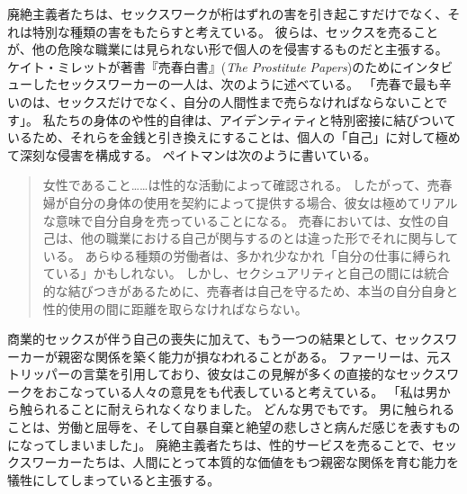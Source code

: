\documentclass[paper=a4,book,openany]{jlreq}
\begin{document}
廃絶主義者たちは、セックスワークが桁はずれの害を引き起こすだけでなく、それは特別な種類の害をもたらすと考えている。
彼らは、セックスを売ることが、他の危険な職業には見られない形で個人のを侵害するものだと主張する。
ケイト・ミレットが著書『売春白書』(\emph{The Prostitute Papers})のためにインタビューしたセックスワーカーの一人は、次のように述べている。
「売春で最も辛いのは、セックスだけでなく、自分の人間性まで売らなければならないことです」\citep[p.84]{millett76:_prost_paper}。
私たちの身体のや性的自律は、アイデンティティと特別密接に結びついているため、それらを金銭と引き換えにすることは、個人の「自己」に対して極めて深刻な侵害を構成する。
ペイトマンは次のように書いている。

\begin{quote}
女性であること……は性的な活動によって確認される。
したがって、売春婦が自分の身体の使用を契約によって提供する場合、彼女は極めてリアルな意味で自分自身を売っていることになる。
売春においては、女性の自己は、他の職業における自己が関与するのとは違った形でそれに関与している。
あらゆる種類の労働者は、多かれ少なかれ「自分の仕事に縛られている」かもしれない。
しかし、セクシュアリティと自己の間には統合的な結びつきがあるために、売春者は自己を守るため、本当の自分自身と性的使用の間に距離を取らなければならない。
\citep{pateman88:_sexual_contr}
\end{quote}

商業的セックスが伴う自己の喪失に加えて、もう一つの結果として、セックスワーカーが親密な関係を築く能力が損なわれることがある。
ファーリーは、元ストリッパーの言葉を引用しており、彼女はこの見解が多くの直接的なセックスワークをおこなっている人々の意見をも代表していると考えている。
「私は男から触られることに耐えられなくなりました。
どんな男でもです。
男に触られることは、労働と屈辱を、そして自暴自棄と絶望の悲しさと病んだ感じを表すものになってしまいました」\citep{farley13:_prost_liber_slaver}。
廃絶主義者たちは、性的サービスを売ることで、セックスワーカーたちは、人間にとって本質的な価値をもつ親密な関係を育む能力を犠牲にしてしまっていると主張する。
\end{document}
